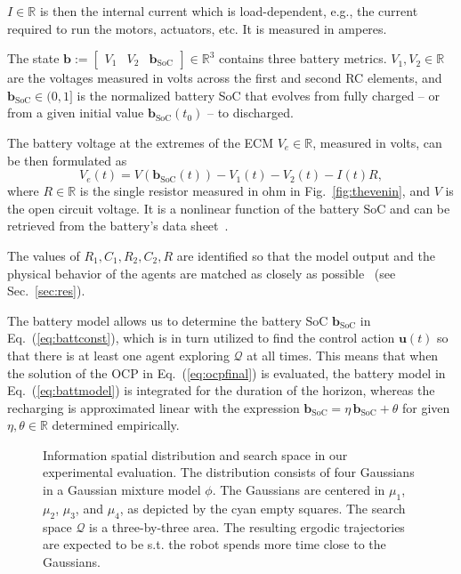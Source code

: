 \documentclass[letterpaper,10pt,conference,twoside]{IEEEtran}
\theoremstyle{definition}
\begin{document}
$I\in\mathbb{R}$ is then the internal current which is load-dependent, e.g., the current required to run the motors, actuators, etc. It is measured in amperes.

The state $\mathbf{b}:=\begin{bmatrix}V_1&V_2&\mathbf{b}_{\text{SoC}}\end{bmatrix}\in\mathbb{R}^3$ contains three battery metrics. $V_1,V_2\in\mathbb{R}$ are the voltages measured in volts across the first and second RC elements, and $\mathbf{b}_{\text{SoC}}\in(0,1]$ is the normalized battery SoC that evolves from fully charged -- or from a given initial value $\mathbf{b}_{\text{SoC}}(t_0)$ -- to discharged.

The battery voltage at the extremes of the ECM $V_e\in\mathbb{R}$, measured in volts, can be then formulated as~\cite{zhao2017observability}
\begin{equation}
  V_e(t)=V(\mathbf{b}_{\text{SoC}}(t))-V_1(t)-V_2(t)-I(t)R,
\end{equation}
where $R\in\mathbb{R}$ is the single resistor measured in ohm in Fig.~\ref{fig:thevenin}, and $V$ is the open circuit voltage. It is a nonlinear function of the battery SoC and can be retrieved from the battery's data sheet~\cite{hinz2019comparison}.

The values of $R_1,C_1,R_2,C_2,R$ are identified so that the model output and the physical behavior of the agents are matched as closely as possible~\cite{zhao2017observability} (see Sec.~\ref{sec:res}).

The battery model allows us to determine the battery SoC $\mathbf{b}_{\text{SoC}}$ in Eq.~(\ref{eq:battconst}), which is in turn utilized to find the control action $\mathbf{u}(t)$ so that there is at least one agent exploring $\mathcal{Q}$ at all times. This means that when the solution of the OCP in Eq.~(\ref{eq:ocpfinal}) is evaluated, the battery model in Eq.~(\ref{eq:battmodel}) is integrated for the duration of the horizon, whereas the recharging is approximated linear with the expression $\mathbf{b}_{\text{SoC}}=\eta\,\mathbf{b}_{\text{SoC}}+\theta$ for given $\eta,\theta\in\mathbb{R}$ determined empirically.

\begin{figure}[t!]
  \begin{minipage}[t!]{.5\columnwidth}
    \vspace*{-.2cm}
    
  \end{minipage}
  \begin{minipage}[c]{.48\columnwidth}
    \vspace*{.05cm}
    \caption{Information spatial distribution and search space in our experimental evaluation. The distribution consists of four Gaussians in a Gaussian mixture model $\phi$. The Gaussians are centered in $\mu_1$, $\mu_2$, $\mu_3$, and $\mu_4$, as depicted by the cyan empty squares. The search space $\mathcal{Q}$ is a three-by-three area. The resulting ergodic trajectories are expected to be s.t. the robot spends more time close to the Gaussians.}
    \label{fig:scenario}
  \end{minipage}
  \vspace*{-.1cm}
\end{figure}
\end{document}
